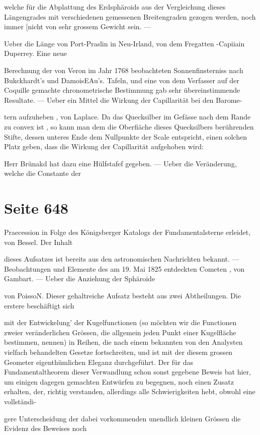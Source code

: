 \documentclass[10pt,a4paper]{article}
\begin{document}
welche für die Abplattung des Erdsphäroids aus der Vergleichung dieses Längengrades mit verschiedenen gemessenen Breitengraden gezogen werden, noch immer [nicht von sehr grossem Gewicht sein. —

Ueber die Länge von Port-Praslin in Neu-Irland, von dem Fregatten -Capiiain Duperrey. Eine neue

Berechnung der von Veron im Jahr 1768 beobachteten Sonnenfinsterniss nach Bukckhardt's und DamoisEAu's. Tafeln, und eine von dem Verfasser auf der Coquille gemachte chronometrische Bestimmung gab sehr übereinstimmende Resultate. — Ueber ein Mittel die Wirkung der Capillarität bei den Barome-

tern aufzuheben , von Laplace. Da das Quecksilber im Gefässe nach dem Rande zu convex ist , so kann man dem die Oberfiäche dieses Quecksilbers berührenden Stifte, dessen unteres Ende dem Nullpunkte der Scale entspricht, einen solchen Platz geben, dass die Wirkung der Capillarität aufgehoben wird:

Herr Brünakd hat dazu eine Hülfstafef gegeben. — Ueber die Veränderung, welche die Constante der


\newpage
\section*{Seite 648}
Praecession in Folge des Königsberger Katalogs der Fundamentalsterne erleidet, von Bessel. Der Inhalt

dieses Aufsatzes ist bereits aus den astronomischen Nachrichten bekannt. — Beobachtungen und Elemente des am 19. Mai 1825 entdeckten Cometen , von Gambart. — Ueber die Anziehung der Sphäroide

von PoissoN. Dieser gehaltreiche Aufsatz besteht aus zwei Abtheilungen. Die erstere beschäftigt sich

mit der Entwickelung' der Kugelfunctionen (so möchten wir die Functionen zweier veränderlichen Grössen, die allgemein jeden Punkt einer Kugelfläche bestimmen, nennen) in Reihen, die nach einem bekannten von den Analysten vielfach behandelten Gesetze fortschreiten, und ist mit der diesem grossen Geometer eigenthümlichen Eleganz durchgeführt. Der für das Fundamentaltheorem dieser Verwandlung schon sonst gegebene Beweis bat hier, um einigen dagegen gemachten Entwürfen zu begegnen, noch einen Zusatz erhalten, der, richtig verstanden, allerdings alle Schwierigkeiten hebt, obwohl eine vollständi-

gere Unterscheidung der dabei vorkommenden unendlich kleinen Grössen die Evidenz des Beweises noch
\end{document}
